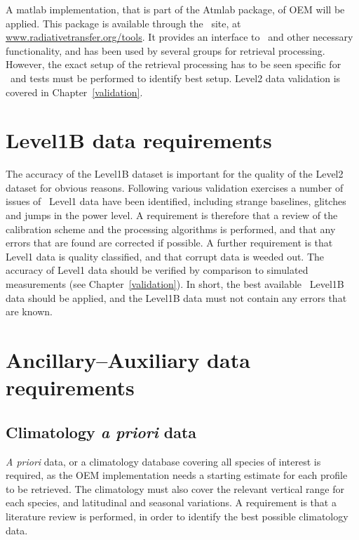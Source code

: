 A matlab implementation, that is part of the Atmlab package, 
of OEM will be applied. This package is available through the \ARTS\ site,
at \url{www.radiativetransfer.org/tools}. It provides an interface
to \ARTS\ and other necessary functionality, and has
been used by several groups for retrieval processing.
However, the exact setup of the retrieval processing
has to be seen specific for \smr\ and tests must be performed
to identify best setup. Level2 data validation 
is covered in Chapter~\ref{validation}.


\section{Level1B data requirements}

The accuracy of the Level1B dataset is important for the quality of the
Level2 dataset for obvious reasons. 
Following various validation exercises a number of 
issues of \smr\ Level1 data have been identified, 
including strange baselines, glitches and jumps in the power level.
A requirement is therefore that a review of the calibration 
scheme and the processing algorithms is performed,
and that any errors that are found are corrected if possible.
A further requirement is that Level1 data is quality classified, 
and that corrupt data is weeded out.
The accuracy of Level1 data should be verified by comparison
to simulated measurements (see Chapter~\ref{validation}).
In short,
the best available \smr\ Level1B data should be applied,
and the Level1B data must not contain any errors that are known.


\section{Ancillary--Auxiliary data requirements}
\subsection{Climatology \textit{a priori} data}
\textit{A priori} data, or a climatology database covering all species of interest
is required, as the OEM implementation needs a starting estimate for each profile
to be retrieved. 
The climatology must also cover the relevant vertical range for each species, and
latitudinal and seasonal variations.
A requirement is that a literature review is performed,
in order to identify the best possible climatology data.


